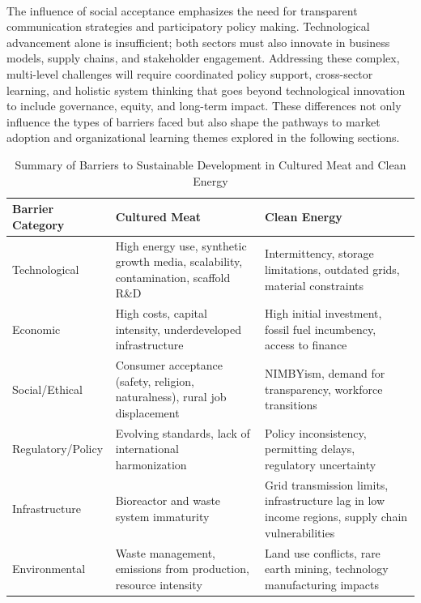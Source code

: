 	\paragraph*{} The influence of social acceptance emphasizes the need for transparent communication strategies and participatory policy making. Technological advancement alone is insufficient; both sectors must also innovate in business models, supply chains, and stakeholder engagement. Addressing these complex, multi-level challenges will require coordinated policy support, cross-sector learning, and holistic system thinking that goes beyond technological innovation to include governance, equity, and long-term impact. These differences not only influence the types of barriers faced but also shape the pathways to market adoption and organizational learning themes explored in the following sections.
	
\begin{table}[h!]
	\centering
	\caption{Summary of Barriers to Sustainable Development in Cultured Meat and Clean Energy}
	\label{tab:barriers_summary}
	\begin{tabularx}{\textwidth}{@{}lXX@{}}
		\toprule
		\textbf{Barrier Category} & \textbf{Cultured Meat}                                                                     & \textbf{Clean Energy}                                                              \\ \midrule
		Technological             & High energy use, synthetic growth media, scalability, contamination, scaffold R\&D          & Intermittency, storage limitations, outdated grids, material constraints        \\ \addlinespace
		Economic                  & High costs, capital intensity, underdeveloped infrastructure                             & High initial investment, fossil fuel incumbency, access to finance             \\ \addlinespace
		Social/Ethical            & Consumer acceptance (safety, religion, naturalness), rural job displacement              & NIMBYism, demand for transparency, workforce transitions                       \\ \addlinespace
		Regulatory/Policy         & Evolving standards, lack of international harmonization                                  & Policy inconsistency, permitting delays, regulatory uncertainty                \\ \addlinespace
		Infrastructure            & Bioreactor and waste system immaturity                                                   & Grid transmission limits, infrastructure lag in low income regions, supply chain vulnerabilities \\ \addlinespace
		Environmental             & Waste management, emissions from production, resource intensity                          & Land use conflicts, rare earth mining, technology manufacturing impacts        \\ \bottomrule
	\end{tabularx}
\end{table}
	
